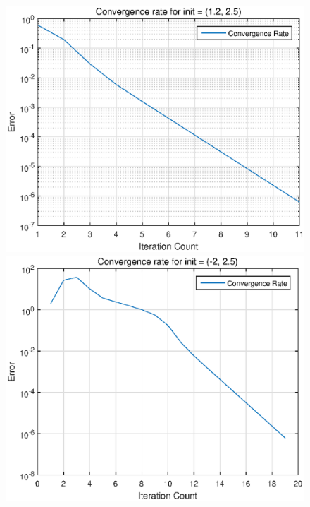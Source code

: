 \begin{figure}[!htb]
\centering
\begin{minipage}{0.45\textwidth}
\includegraphics[width = \textwidth]{res1.eps}
\end{minipage}
\begin{minipage}{0.45\textwidth}
\includegraphics[width = \textwidth]{res2.eps}
\end{minipage} \\
\begin{minipage}{0.45\textwidth}

\end{minipage}
\end{figure}
